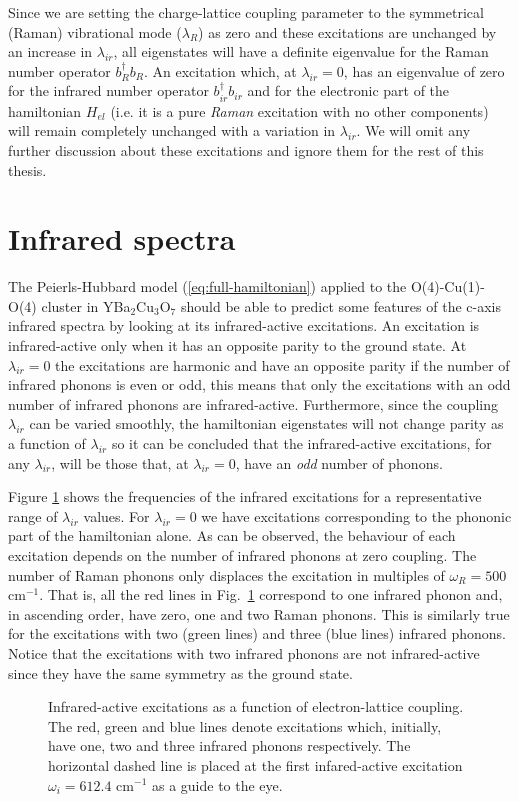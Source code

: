 Since we are setting the charge-lattice coupling parameter to the symmetrical (Raman) vibrational mode ($\lambda_R$) as zero and these excitations are unchanged by an increase in $\lambda_{ir}$, all eigenstates will have a definite eigenvalue for the Raman number operator $b_R^\dagger b_R$. 
An excitation which, at $\lambda_{ir}=0$, has an eigenvalue of zero for the infrared number operator $b_{ir}^\dagger b_{ir}$ and for the electronic part of the hamiltonian $H_{el}$ (i.e. it is a pure \textit{Raman} excitation with no other components) will remain completely unchanged with a variation in $\lambda_{ir}$.
We will omit any further discussion about these excitations and ignore them for the rest of this thesis. 


\section{Infrared spectra}
\label{sec:irSpectra}

The Peierls-Hubbard model (\ref{eq:full-hamiltonian}) applied to the O(4)-Cu(1)-O(4) cluster in YBa$_2$Cu$_3$O$_7$ should be able to predict some features of the c-axis infrared spectra by looking at its infrared-active excitations.
An excitation is infrared-active only when it has an opposite parity to the ground state.
At $\lambda_{ir}=0$ the excitations are harmonic and have an opposite parity if the number of infrared phonons is even or odd, this means that only the excitations with an odd number of infrared phonons are infrared-active.
Furthermore, since the coupling $\lambda_{ir}$ can be varied smoothly, the hamiltonian eigenstates will not change parity as a function of $\lambda_{ir}$ so it can be concluded that the infrared-active excitations, for any $\lambda_{ir}$, will be those that, at $\lambda_{ir}=0$, have an \textit{odd} number of phonons.

Figure \ref{fig:irSpectra} shows the frequencies of the infrared excitations for a representative range of $\lambda_{ir}$ values.
For $\lambda_{ir}=0$ we have excitations corresponding to the phononic part of the hamiltonian alone.
As can be observed, the behaviour of each excitation depends on the number of infrared phonons at zero coupling.
The number of Raman phonons only displaces the excitation in multiples of $\omega_R=500$ cm$^{-1}$.
That is, all the red lines in Fig.\ \ref{fig:irSpectra} correspond to one infrared phonon and, in ascending order, have zero, one and two Raman phonons.
This is similarly true for the excitations with two (green lines) and three (blue lines) infrared phonons.
Notice that the excitations with two infrared phonons are not infrared-active since they have the same symmetry as the ground state.
%
\begin{figure}[ht]
  \centering
  
  \caption[Infrared-active excitations as a function of electron-lattice coupling.]
  {Infrared-active excitations as a function of electron-lattice coupling.
  The red, green and blue lines denote excitations which, initially, have one, two and three infrared phonons respectively.
  The horizontal dashed line is placed at the first infared-active excitation $\omega_i=612.4$ cm$^{-1}$ as a guide to the eye.}
  \label{fig:irSpectra}
\end{figure}

